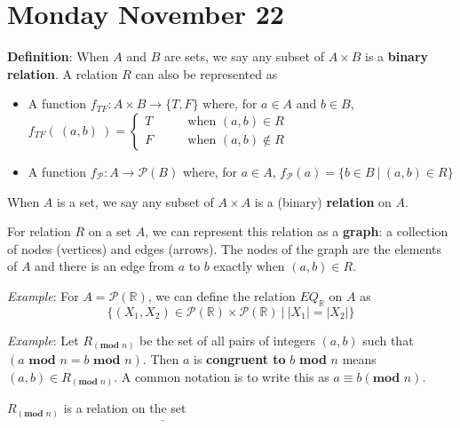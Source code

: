 \documentclass[12pt, oneside]{article}
\begin{document}
\begin{flushright}
\end{flushright} 
\section*{Monday November 22}



{\bf Definition}: When $A$ and $B$ are sets, we say any subset of $A \times B$ is a {\bf binary relation}. 
A relation $R$ can also be represented as

\begin{itemize}
\item A function $f_{TF} : A \times B \to \{T, F\}$
where, for $a \in A$ and $b \in B$, $f_{TF}(~(a,b)~) = 
\begin{cases} 
    T \qquad&\text{when } (a,b) \in R \\
    F \qquad&\text{when } (a,b) \notin R
\end{cases}$
\item A function $f_{\mathcal{P}} : A   \to \mathcal{P}(B)$ where, for $a \in A$, 
$f_{\mathcal{P}}( a ) = \{ b \in B ~|~ (a,b) \in R \}$
\end{itemize}

When $A$ is a set, we say any subset of $A \times A$ is a (binary) {\bf relation} on $A$.

 

For relation $R$ on a set $A$, we can represent this relation as a
{\bf graph}: a collection of nodes (vertices) and edges (arrows). The 
nodes of the graph are the elements of $A$ and 
there is an edge from $a$ to $b$ exactly when $(a,b) \in R$.

\vspace{100pt} 

{\it Example}: For $A = \mathcal{P}(\mathbb{R})$, we can define the relation $EQ_{\mathbb{R}}$ on $A$ as 
\[
\{ (X_1, X_2 ) \in\mathcal{P}(\mathbb{R})  \times \mathcal{P}(\mathbb{R}) ~|~ |X_1| = |X_2| \}
\]

\vspace{50pt}

{\it Example}: Let $R_{(\textbf{mod } n)}$ be the set of all pairs of integers $(a, b)$ such that $(a \textbf{ mod } n = b \textbf{ mod } n)$.
Then $a$ is {\bf congruent to} $b$ \textbf{mod} $n$ means $(a, b) \in R_{(\textbf{mod } n)}$. A common notation is to write this as $a \equiv b (\textbf{mod } n)$.


$R_{(\textbf{mod } n)}$ is a relation on the set $\underline{\hspace{25em}}$
\end{document}
